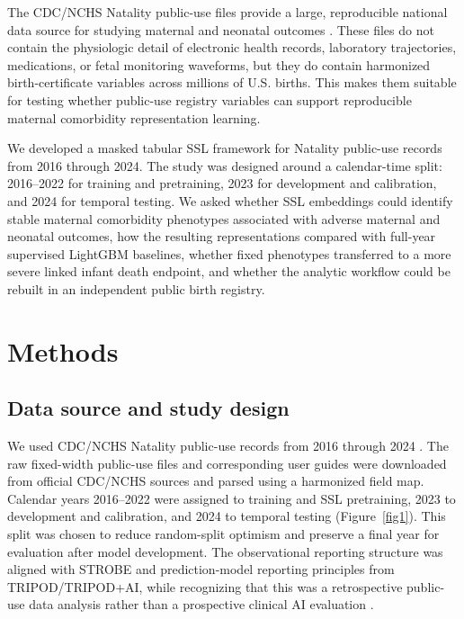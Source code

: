 \documentclass[pdflatex,sn-vancouver-num]{sn-jnl}
\begin{document}
The CDC/NCHS Natality public-use files provide a large, reproducible national data source for studying maternal and neonatal outcomes \cite{nchs_vitalstats_online,nchs_natality_2024_userguide}. These files do not contain the physiologic detail of electronic health records, laboratory trajectories, medications, or fetal monitoring waveforms, but they do contain harmonized birth-certificate variables across millions of U.S. births. This makes them suitable for testing whether public-use registry variables can support reproducible maternal comorbidity representation learning.

We developed a masked tabular SSL framework for Natality public-use records from 2016 through 2024. The study was designed around a calendar-time split: 2016--2022 for training and pretraining, 2023 for development and calibration, and 2024 for temporal testing. We asked whether SSL embeddings could identify stable maternal comorbidity phenotypes associated with adverse maternal and neonatal outcomes, how the resulting representations compared with full-year supervised LightGBM baselines, whether fixed phenotypes transferred to a more severe linked infant death endpoint, and whether the analytic workflow could be rebuilt in an independent public birth registry.

\section{Methods}\label{sec:methods}

\subsection{Data source and study design}\label{subsec:data-source}

We used CDC/NCHS Natality public-use records from 2016 through 2024 \cite{nchs_vitalstats_online,nchs_natality_2024_userguide}. The raw fixed-width public-use files and corresponding user guides were downloaded from official CDC/NCHS sources and parsed using a harmonized field map. Calendar years 2016--2022 were assigned to training and SSL pretraining, 2023 to development and calibration, and 2024 to temporal testing (Figure~\ref{fig1}). This split was chosen to reduce random-split optimism and preserve a final year for evaluation after model development. The observational reporting structure was aligned with STROBE and prediction-model reporting principles from TRIPOD/TRIPOD+AI, while recognizing that this was a retrospective public-use data analysis rather than a prospective clinical AI evaluation \cite{vonelm2007strobe,collins2015tripod,collins2024tripodai}.
\end{document}
